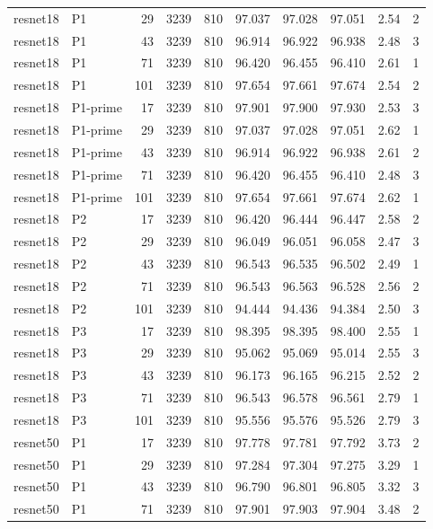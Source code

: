 \begin{longtable}{p{2.25cm}p{1.1cm}rrrrrrrr}
resnet18 & P1 & 29 & 3239 & 810 & 97.037 & 97.028 & 97.051 & 2.54 & 2 \\ 
resnet18 & P1 & 43 & 3239 & 810 & 96.914 & 96.922 & 96.938 & 2.48 & 3 \\ 
resnet18 & P1 & 71 & 3239 & 810 & 96.420 & 96.455 & 96.410 & 2.61 & 1 \\ 
resnet18 & P1 & 101 & 3239 & 810 & 97.654 & 97.661 & 97.674 & 2.54 & 2 \\ 
resnet18 & P1-prime & 17 & 3239 & 810 & 97.901 & 97.900 & 97.930 & 2.53 & 3 \\ 
resnet18 & P1-prime & 29 & 3239 & 810 & 97.037 & 97.028 & 97.051 & 2.62 & 1 \\ 
resnet18 & P1-prime & 43 & 3239 & 810 & 96.914 & 96.922 & 96.938 & 2.61 & 2 \\ 
resnet18 & P1-prime & 71 & 3239 & 810 & 96.420 & 96.455 & 96.410 & 2.48 & 3 \\ 
resnet18 & P1-prime & 101 & 3239 & 810 & 97.654 & 97.661 & 97.674 & 2.62 & 1 \\ 
resnet18 & P2 & 17 & 3239 & 810 & 96.420 & 96.444 & 96.447 & 2.58 & 2 \\ 
resnet18 & P2 & 29 & 3239 & 810 & 96.049 & 96.051 & 96.058 & 2.47 & 3 \\ 
resnet18 & P2 & 43 & 3239 & 810 & 96.543 & 96.535 & 96.502 & 2.49 & 1 \\ 
resnet18 & P2 & 71 & 3239 & 810 & 96.543 & 96.563 & 96.528 & 2.56 & 2 \\ 
resnet18 & P2 & 101 & 3239 & 810 & 94.444 & 94.436 & 94.384 & 2.50 & 3 \\ 
resnet18 & P3 & 17 & 3239 & 810 & 98.395 & 98.395 & 98.400 & 2.55 & 1 \\ 
resnet18 & P3 & 29 & 3239 & 810 & 95.062 & 95.069 & 95.014 & 2.55 & 3 \\ 
resnet18 & P3 & 43 & 3239 & 810 & 96.173 & 96.165 & 96.215 & 2.52 & 2 \\ 
resnet18 & P3 & 71 & 3239 & 810 & 96.543 & 96.578 & 96.561 & 2.79 & 1 \\ 
resnet18 & P3 & 101 & 3239 & 810 & 95.556 & 95.576 & 95.526 & 2.79 & 3 \\ 
resnet50 & P1 & 17 & 3239 & 810 & 97.778 & 97.781 & 97.792 & 3.73 & 2 \\ 
resnet50 & P1 & 29 & 3239 & 810 & 97.284 & 97.304 & 97.275 & 3.29 & 1 \\ 
resnet50 & P1 & 43 & 3239 & 810 & 96.790 & 96.801 & 96.805 & 3.32 & 3 \\ 
resnet50 & P1 & 71 & 3239 & 810 & 97.901 & 97.903 & 97.904 & 3.48 & 2 \\ 

\end{longtable}
